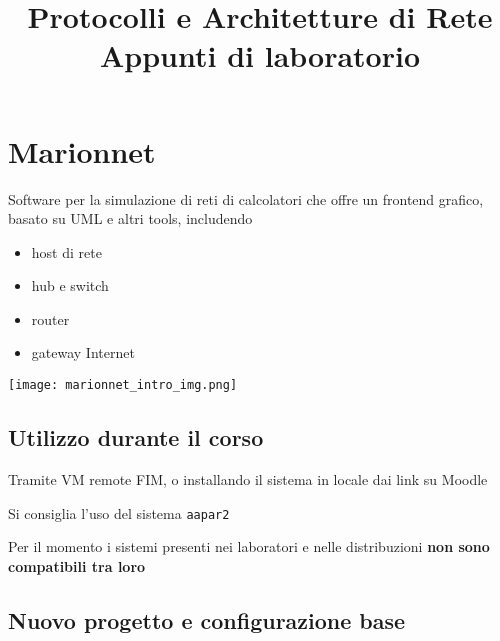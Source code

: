 

\title{%
Protocolli e Architetture di Rete\\
\large Appunti di laboratorio}


\maketitle
\tableofcontents
\newpage
\section*{Marionnet}

\noindent
\begin{minipage}[c]{.5\textwidth}
Software per la simulazione di reti di calcolatori che offre un frontend grafico, basato su UML e altri tools, includendo
\begin{itemize}
  \item host di rete
  \item hub e switch
  \item router
  \item gateway Internet
\end{itemize}
\end{minipage}
\hfill
\begin{minipage}[c]{.3\textwidth}
\texttt{[image: marionnet\_intro\_img.png]}
\end{minipage}

\subsection*{Utilizzo durante il corso}

Tramite VM remote FIM, o installando il sistema in locale dai link su Moodle

Si consiglia l'uso del sistema \lstinline|aapar2|

\begin{warning}
    Per il momento i sistemi presenti nei laboratori e nelle distribuzioni \textbf{non sono compatibili tra loro}
\end{warning}

\subsection*{Nuovo progetto e configurazione base}

